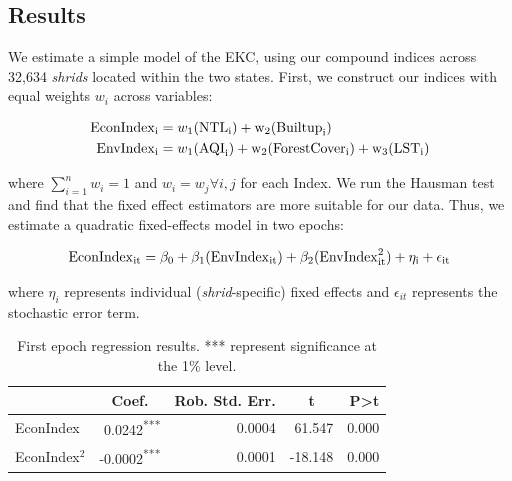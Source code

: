 \documentclass[a4paper,12pt]{article}
\begin{document}
\subsection{Results}

We estimate a simple model of the EKC, using our compound indices across 32,634 \textit{shrids} located within the two states. First, we construct our indices with equal weights $w_i$ across variables:

\begin{align*}
    \rm{EconIndex}_i &=  w_1(\rm{NTL}_i) + w_2(\rm{Builtup}_i) \\
    \rm{EnvIndex}_i &=  w_1(\rm{AQI}_i) + w_2(\rm{ForestCover}_i) + w_3(\rm{LST}_i)
\end{align*}

where $\sum_{i=1}^{n}w_i = 1$ and $w_i = w_j \forall i, j$ for each Index. We run the Hausman test and find that the fixed effect estimators are more suitable for our data. Thus, we estimate a quadratic fixed-effects model in two epochs:

\[
    \rm{EconIndex}_{it} = \beta_0 + \beta_1(\rm{EnvIndex}_{it}) + \beta_2(\rm{EnvIndex}_{it}^2) + \eta_i + \epsilon_{it} 
\]

where $\eta_i$ represents individual (\textit{shrid}-specific) fixed effects and $\epsilon_{it}$ represents the stochastic error term.

\begin{table}[h]
    \centering
    \begin{tabular}{l|rrrr}
    \hline
    \multicolumn{1}{c}{\textbf{}} & \multicolumn{1}{c}{\textbf{Coef.}} & \multicolumn{1}{c}{\textbf{Rob. Std. Err.}} & \multicolumn{1}{c}{\textbf{t}} & \textbf{P\textgreater{}t} \\ \hline
    EconIndex                     & 0.0242\textsuperscript{***}                             & 0.0004                                 & 61.547     & 0.000                     \\ 
    EconIndex$^2$                   & -0.0002\textsuperscript{***}                            & 0.0001                                 & -18.148    & 0.000                    
    \\ \hline        
\end{tabular}
\caption{First epoch regression results. *** represent significance at the 1\% level.}
\label{tab:epoch1}
\end{table}
\end{document}
